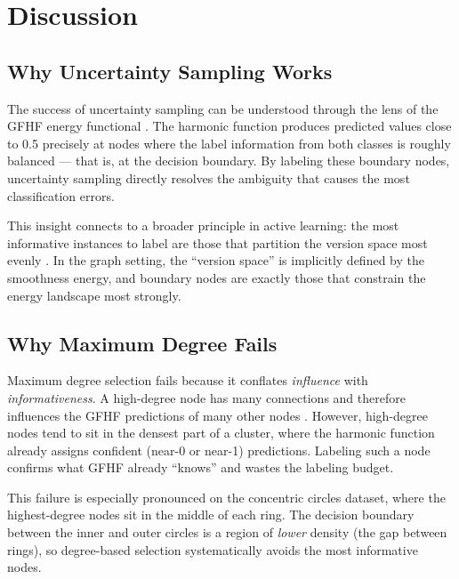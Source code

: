 \documentclass[12pt]{article}
\begin{document}
\section{Discussion}

\subsection{Why Uncertainty Sampling Works}

The success of uncertainty sampling \cite{Lewis1994} can be understood through the lens of the GFHF energy functional \cite{Zhu2003}. The harmonic function produces predicted values close to 0.5 precisely at nodes where the label information from both classes is roughly balanced --- that is, at the decision boundary. By labeling these boundary nodes, uncertainty sampling directly resolves the ambiguity that causes the most classification errors.

This insight connects to a broader principle in active learning: the most informative instances to label are those that partition the version space most evenly \cite{Settles2012}. In the graph setting, the ``version space'' is implicitly defined by the smoothness energy, and boundary nodes are exactly those that constrain the energy landscape most strongly.

\subsection{Why Maximum Degree Fails}

Maximum degree selection fails because it conflates \textit{influence} with \textit{informativeness}. A high-degree node has many connections and therefore influences the GFHF predictions of many other nodes \cite{Zhu2003}. However, high-degree nodes tend to sit in the densest part of a cluster, where the harmonic function already assigns confident (near-0 or near-1) predictions. Labeling such a node confirms what GFHF already ``knows'' and wastes the labeling budget.

This failure is especially pronounced on the concentric circles dataset, where the highest-degree nodes sit in the middle of each ring. The decision boundary between the inner and outer circles is a region of \textit{lower} density (the gap between rings), so degree-based selection systematically avoids the most informative nodes.
\end{document}
